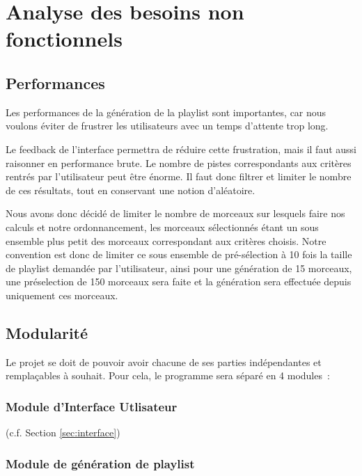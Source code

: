 \newpage

\section{Analyse des besoins non fonctionnels}
\label{besoins:nfonc}

\subsection{Performances}
\label{besoins:nfonc:perf}

Les performances de la génération de la playlist sont importantes, car nous
voulons éviter de frustrer les utilisateurs avec un temps d'attente trop long.

Le feedback de l’interface permettra de réduire cette frustration, mais il faut
aussi raisonner en performance brute. Le nombre de pistes correspondants aux
critères rentrés par l’utilisateur peut être énorme. Il faut donc filtrer et
limiter le nombre de ces résultats, tout en conservant une notion d’aléatoire.

Nous avons donc décidé de limiter le nombre de morceaux sur lesquels faire nos
calculs et notre ordonnancement, les morceaux sélectionnés étant un sous ensemble
plus petit des morceaux correspondant aux critères choisis. Notre convention est
donc de limiter ce sous ensemble de pré-sélection à 10 fois la taille de playlist
demandée par l’utilisateur, ainsi pour une génération de 15 morceaux, une préselection de 150 morceaux sera faite et la génération sera effectuée depuis uniquement ces morceaux.

\subsection{Modularité}
\label{besoins:nfonc:perf:mod}
    
Le projet se doit de pouvoir avoir chacune de ses parties indépendantes et
remplaçables à souhait. Pour cela, le programme sera séparé en 4 modules~:

\subsubsection{Module d'Interface Utlisateur}
\label{besoins:nfonc:perf:mod:iu}

(c.f. Section \ref{sec:interface})

\subsubsection{Module de génération de playlist}
\label{besoins:nfonc:perf:mod:generator}

